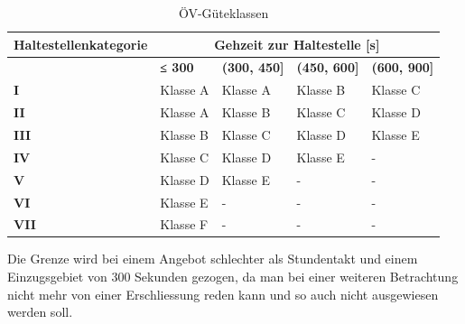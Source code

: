\begin{table}[H]
    \begin{tabular}[c]{l p{2.6cm} p{2.6cm} p{2.6cm} p{2.6cm}}
        \toprule
        \textbf{Haltestellenkategorie}
                                & \multicolumn{4}{c}{\textbf{Gehzeit zur \gls{Haltestelle} [s]}}\\
        \midrule
        \textbf{}
                                & \textbf{≤ 300}
                                & \textbf{(300, 450]}
                                & \textbf{(450, 600]}
                                & \textbf{(600, 900]}\\
        \textbf{I}
                                & Klasse A
                                & Klasse A
                                & Klasse B
                                & Klasse C\\
        \textbf{II}
                                & Klasse A
                                & Klasse B
                                & Klasse C
                                & Klasse D\\
        \textbf{III}
                                & Klasse B
                                & Klasse C
                                & Klasse D
                                & Klasse E\\
        \textbf{IV}
                                & Klasse C
                                & Klasse D
                                & Klasse E
                                & -\\
        \textbf{V}
                                & Klasse D
                                & Klasse E
                                & -
                                & -\\
        \textbf{VI}
                                & Klasse E
                                & -
                                & -
                                & -\\
        \textbf{VII}
                                & Klasse F
                                & -
                                & -
                                & -\\                                
        \bottomrule
    \end{tabular}
    \caption{ÖV-Güteklassen}
    \label{table:ÖV-Güteklassen}
\end{table}

Die Grenze wird bei einem Angebot schlechter als Stundentakt und einem Einzugsgebiet von 300 Sekunden gezogen, da man bei einer weiteren Betrachtung nicht mehr von einer Erschliessung reden kann und so auch nicht ausgewiesen werden soll.
